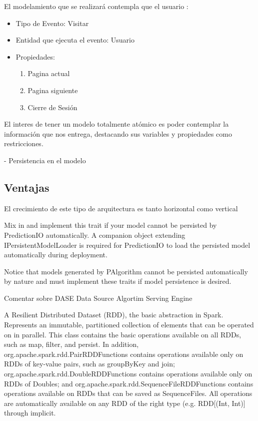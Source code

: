   El modelamiento que se realizará contempla que el usuario :


    \begin{itemize}
      \item Tipo de Evento: Visitar
      \item Entidad que ejecuta el evento: Usuario
      \item Propiedades:
          \begin{enumerate}
            \item Pagina actual
            \item Pagina siguiente
            \item Cierre de Sesión
          \end{enumerate}
    \end{itemize}



    El interes de tener un modelo totalmente atómico es poder contemplar la información que nos entrega, destacando sus variables y propiedades como restricciones.


    - Persistencia en el modelo


  \subsection{Ventajas }

El crecimiento de este tipo de arquitectura es tanto horizontal como vertical


  Mix in and implement this trait if your model cannot be persisted by PredictionIO automatically. A companion object extending IPersistentModelLoader is required for PredictionIO to load the persisted model automatically during deployment.

Notice that models generated by PAlgorithm cannot be persisted automatically by nature and must implement these traits if model persistence is desired.



Comentar sobre DASE
Data Source
Algortim
Serving
Engine


A Resilient Distributed Dataset (RDD), the basic abstraction in Spark. Represents an immutable, partitioned collection of elements that can be operated on in parallel. This class contains the basic operations available on all RDDs, such as map, filter, and persist. In addition, org.apache.spark.rdd.PairRDDFunctions contains operations available only on RDDs of key-value pairs, such as groupByKey and join; org.apache.spark.rdd.DoubleRDDFunctions contains operations available only on RDDs of Doubles; and org.apache.spark.rdd.SequenceFileRDDFunctions contains operations available on RDDs that can be saved as SequenceFiles. All operations are automatically available on any RDD of the right type (e.g. RDD[(Int, Int)] through implicit.

